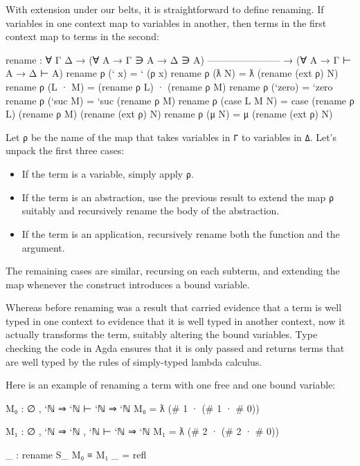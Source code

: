 With extension under our belts, it is straightforward to define
renaming. If variables in one context map to variables in another, then
terms in the first context map to terms in the second:

\begin{fence}
\begin{code}
rename : ∀ {Γ Δ}
  → (∀ {A} → Γ ∋ A → Δ ∋ A)
    -----------------------
  → (∀ {A} → Γ ⊢ A → Δ ⊢ A)
rename ρ (` x)          =  ` (ρ x)
rename ρ (ƛ N)          =  ƛ (rename (ext ρ) N)
rename ρ (L · M)        =  (rename ρ L) · (rename ρ M)
rename ρ (`zero)        =  `zero
rename ρ (`suc M)       =  `suc (rename ρ M)
rename ρ (case L M N)   =  case (rename ρ L) (rename ρ M) (rename (ext ρ) N)
rename ρ (μ N)          =  μ (rename (ext ρ) N)
\end{code}
\end{fence}

Let \texttt{ρ} be the name of the map that takes variables in \texttt{Γ}
to variables in \texttt{Δ}. Let's unpack the first three cases:

\begin{itemize}
\item
  If the term is a variable, simply apply \texttt{ρ}.
\item
  If the term is an abstraction, use the previous result to extend the
  map \texttt{ρ} suitably and recursively rename the body of the
  abstraction.
\item
  If the term is an application, recursively rename both the function
  and the argument.
\end{itemize}

The remaining cases are similar, recursing on each subterm, and
extending the map whenever the construct introduces a bound variable.

Whereas before renaming was a result that carried evidence that a term
is well typed in one context to evidence that it is well typed in
another context, now it actually transforms the term, suitably altering
the bound variables. Type checking the code in Agda ensures that it is
only passed and returns terms that are well typed by the rules of
simply-typed lambda calculus.

Here is an example of renaming a term with one free and one bound
variable:

\begin{fence}
\begin{code}
M₀ : ∅ , `ℕ ⇒ `ℕ ⊢ `ℕ ⇒ `ℕ
M₀ = ƛ (# 1 · (# 1 · # 0))

M₁ : ∅ , `ℕ ⇒ `ℕ , `ℕ ⊢ `ℕ ⇒ `ℕ
M₁ = ƛ (# 2 · (# 2 · # 0))

_ : rename S_ M₀ ≡ M₁
_ = refl
\end{code}
\end{fence}

